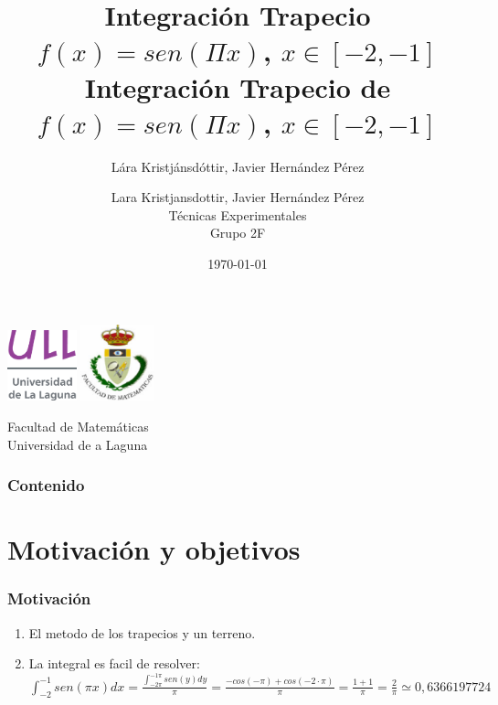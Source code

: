 \documentclass{beamer}
\title{Integración Trapecio \\ $f(x)=sen(\Pi x)$, $x \in [-2,-1]$}
\author{Lára Kristjánsdóttir, Javier Hernández Pérez}
\author{Lara Kristjansdottir, Javier Hernández Pérez\\ Técnicas Experimentales \\ Grupo 2F}
\date{\today}
\begin{document}
\begin{frame}
  \includegraphics[width=0.15\textwidth]{img/ullesc.eps}
  \hspace*{7.5cm}
  \includegraphics[width=0.16\textwidth]{img/fmatesc.eps}
  \titlepage
  \begin{scriptsize}
    \begin{center}
    \title{Integración Trapecio de $f(x)=sen(\Pi x)$, $x \in [-2,-1]$}
      Facultad de Matemáticas \\Universidad de a Laguna
    \end{center}
  \end{scriptsize}
\end{frame}
\begin{frame}
  \frametitle{Contenido}
  \tableofcontents
\end{frame} 
\section{Motivación y objetivos}
\begin{frame}
\frametitle{Motivación}
\begin{enumerate}
\item El metodo de los trapecios y un terreno.\\
\pause
\item La integral es facil de resolver:\\
$\int _{-2}^{-1} sen(\pi x) dx=\frac{\int _{-2 \pi}^{-1\pi}sen(y)dy}{\pi}=\frac{-cos(-\pi)+cos(-2 \cdot \pi)}{\pi}=\frac{1+1}{\pi}=\frac{2}{\pi}\simeq 0,6366197724$
\end{enumerate}
\end{frame}
\end{document}

